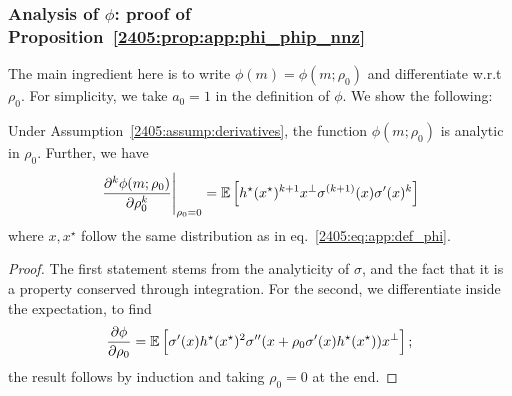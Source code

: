 \subsubsection*{Analysis of $\phi$: proof of Proposition~\ref{2405:prop:app:phi_phip_nnz}}

The main ingredient here is to write $\phi(m) = \phi(m; \rho_0)$ and differentiate w.r.t $\rho_0$. For simplicity, we take $a_0 = 1$ in the definition of $\phi$. We show the following:
\begin{lemma}\label{2405:lem:app:phi_diff}
  Under Assumption~\ref{2405:assump:derivatives}, the function $\phi(m; \rho_0)$ is analytic in $\rho_0$. Further, we have
  \begin{equation}
    \left.\frac{\partial^k \phi(m; \rho_0)}{\partial \rho_0^k}\right|_{\rho_0 = 0} = \mathbb{E}\left[h^\star(x^\star)^{k+1} x^\bot \sigma^{(k+1)}(x) \sigma'(x)^k\right]
  \end{equation}
  where $x, x^\star$ follow the same distribution as in eq.~\eqref{2405:eq:app:def_phi}.
\end{lemma}

\begin{proof}
  The first statement stems from the analyticity of $\sigma$, and the fact that it is a property conserved through integration. For the second, we differentiate inside the expectation, to find
  \[ \frac{\partial \phi}{\partial \rho_0} = \mathbb{E}\left[\sigma'(x)h^\star(x^\star)^2 \sigma''(x + \rho_0 \sigma'(x)h^\star(x^\star)) x^\bot\right]; \]
  the result follows by induction and taking $\rho_0 = 0$ at the end.
\end{proof}

